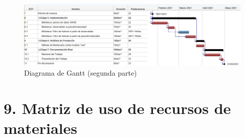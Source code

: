 \documentclass[11pt]{charter}
\begin{document}
\begin{figure}[H]
\centering 
\includegraphics[width=\textwidth]{./Figuras/Gantt2.pdf}
\caption{Diagrama de Gantt (segunda parte)}
\label{fig:Gantt}
\end{figure}


\section{9. Matriz de uso de recursos de materiales}
\label{sec:recursos}
\end{document}
